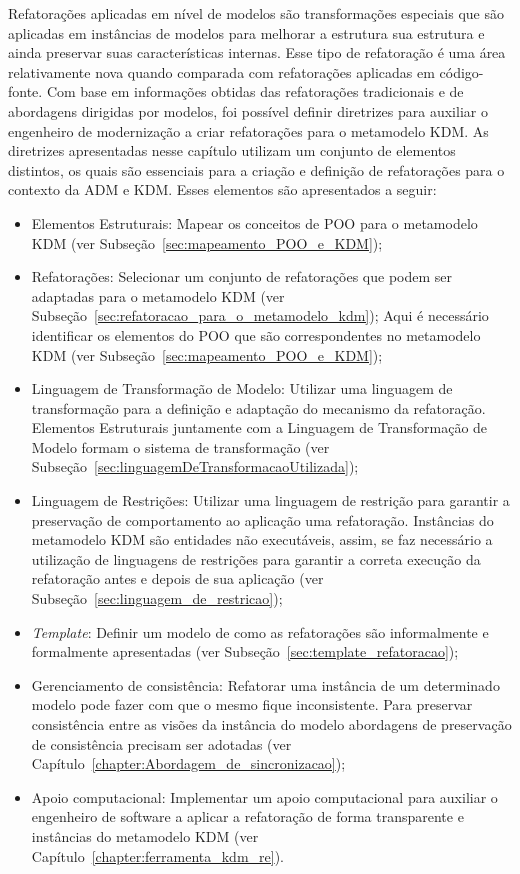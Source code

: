 Refatorações aplicadas em nível de modelos são transformações especiais que são aplicadas em instâncias de modelos para melhorar a estrutura sua estrutura e ainda preservar suas características internas. Esse tipo de refatoração é uma área relativamente nova quando comparada com refatorações aplicadas em código-fonte. Com base em informações obtidas das refatorações tradicionais e de abordagens dirigidas por modelos, foi possível definir diretrizes para auxiliar o engenheiro de modernização a criar refatorações para o metamodelo KDM. As diretrizes apresentadas nesse capítulo utilizam um conjunto de elementos distintos, os quais são essenciais para a criação e definição de refatorações para o contexto da ADM e KDM. Esses elementos são apresentados a seguir:

\begin{itemize}
\item Elementos Estruturais: Mapear os conceitos de POO para o metamodelo KDM (ver Subseção~\ref{sec:mapeamento_POO_e_KDM});

\item Refatorações: Selecionar um conjunto de refatorações que podem ser adaptadas para o metamodelo KDM (ver Subseção~\ref{sec:refatoracao_para_o_metamodelo_kdm});
Aqui é necessário identificar os elementos do POO que são correspondentes no metamodelo KDM (ver Subseção~\ref{sec:mapeamento_POO_e_KDM});

\item Linguagem de Transformação de Modelo: Utilizar uma linguagem de transformação para a definição e adaptação do mecanismo da refatoração. Elementos Estruturais juntamente com a Linguagem de Transformação de Modelo formam o sistema de transformação (ver Subseção~\ref{sec:linguagemDeTransformacaoUtilizada});

\item Linguagem de Restrições: Utilizar uma linguagem de restrição para garantir a preservação de comportamento ao aplicação uma refatoração. Instâncias do metamodelo KDM são entidades não executáveis, assim, se faz necessário a utilização de linguagens de restrições para garantir a correta execução da refatoração antes e depois de sua aplicação (ver Subseção~\ref{sec:linguagem_de_restricao});

\item \textit{Template}: Definir um modelo de como as refatorações são informalmente e formalmente apresentadas (ver Subseção~\ref{sec:template_refatoracao});

\item Gerenciamento de consistência: Refatorar uma instância de um determinado modelo pode fazer com que o mesmo fique inconsistente. Para preservar consistência entre as visões da instância do modelo abordagens de preservação de consistência precisam ser adotadas (ver Capítulo~\ref{chapter:Abordagem_de_sincronizacao});

\item Apoio computacional: Implementar um apoio computacional para auxiliar o engenheiro de software a aplicar a refatoração de forma transparente e instâncias do metamodelo KDM (ver Capítulo~\ref{chapter:ferramenta_kdm_re}).
\end{itemize}


